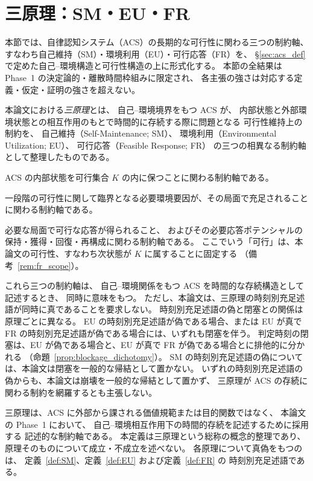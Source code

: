 \section{三原理：SM・EU・FR}
\label{sec:three_principles}

本節では、自律認知システム（ACS）の長期的な可行性に関わる三つの制約軸、
すなわち自己維持（SM）・環境利用（EU）・可行応答（FR）を、
\S\ref{sec:acs_def} で定めた自己--環境構造と可行性構造の上に形式化する。
本節の全結果は Phase~1 の決定論的・離散時間枠組みに限定され、
各主張の強さは対応する定義・仮定・証明の強さを超えない。

\begin{definition}[三原理の概念的定義]
\label{def:three_principles_concept}

本論文における\emph{三原理}とは、
自己--環境境界をもつ ACS が、
内部状態と外部環境状態との相互作用のもとで時間的に存続する際に問題となる
可行性維持上の制約を、
自己維持（Self-Maintenance; SM）、
環境利用（Environmental Utilization; EU）、
可行応答（Feasible Response; FR）
の三つの相異なる制約軸として整理したものである。

\begin{description}[style=nextline]
  \item[SM]
  ACS の内部状態を可行集合 $K$ の内に保つことに関わる制約軸である。
  \item[EU]
  一段階の可行性に関して臨界となる必要環境要因が、その局面で充足されることに関わる制約軸である。
  \item[FR]
  必要な局面で可行な応答が得られること、
  およびその必要応答ポテンシャルの保持・獲得・回復・再構成に関わる制約軸である。
  ここでいう「可行」は、本論文の可行性、すなわち次状態が $K$ に属することに固定する
  （備考~\ref{rem:fr_scope}）。
\end{description}

これら三つの制約軸は、
自己--環境関係をもつ ACS を時間的な存続構造として記述するとき、
同時に意味をもつ。
ただし、本論文は、三原理の時刻別充足述語が同時に真であることを要求しない。
時刻別充足述語の偽と閉塞との関係は原理ごとに異なる。
EU の時刻別充足述語が偽である場合、または EU が真で FR の時刻別充足述語が偽である場合には、いずれも閉塞を伴う。
判定時刻の閉塞は、EU が偽である場合と、EU が真で FR が偽である場合とに排他的に分かれる
（命題~\ref{prop:blockage_dichotomy}）。
SM の時刻別充足述語の偽については、本論文は閉塞を一般的な帰結として置かない。
いずれの時刻別充足述語の偽からも、本論文は崩壊を一般的な帰結として置かず、
三原理が ACS の存続に関わる制約を網羅するとも主張しない。

三原理は、ACS に外部から課される価値規範または目的関数ではなく、
本論文の Phase~1 において、
自己--環境相互作用下の時間的存続を記述するために採用する
記述的な制約軸である。
本定義は三原理という総称の概念的整理であり、
原理そのものについて成立・不成立を述べない。
各原理について真偽をもつのは、
定義~\ref{def:SM}、定義~\ref{def:EU} および定義~\ref{def:FR} の
時刻別充足述語である。
\end{definition}

